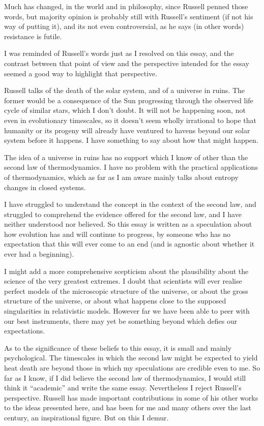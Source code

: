 \documentclass[10pt,titlepage]{article}
\begin{document}
Much has changed, in the world and in philosophy, since Russell penned those words, but majority opinion is probably still with Russell's sentiment (if not his way of putting it), and its not even controversial, as he says (in other words) resistance is futile.

I was reminded of Russell's words just as I resolved on this essay, and the contrast between that point of view and the perspective intended for the essay seemed a good way to highlight that perspective.

Russell talks of the death of the solar system, and of a universe in ruins.
The former would be a consequence of the Sun progressing through the observed life cycle of similar stars, which I don't doubt.
It will not be happening soon, not even in evolutionary timescales, so it doesn't seem wholly irrational to hope that humanity or its progeny will already have ventured to havens beyond our solar system before it happens.
I have something to say about how that might happen.

The idea of a universe in ruins has no support which I know of other than the second law of thermodynamics.
I have no problem with the practical applications of thermodynamics, which as far as I am aware mainly talks about entropy changes in closed systems.

I have struggled to understand the concept in the context of the second law, and struggled to comprehend the evidence offered for the second law, and I have neither understood nor believed.
So this essay is written as a speculation about how evolution has and will continue to progress, by someone who has no expectation that this will ever come to an end (and is agnostic about whether it ever had a beginning).

I might add a more comprehensive scepticism about the plausibility about the science of the very greatest extremes.
I doubt that scientists will ever realise perfect models of the microscopic structure of the universe, or about the gross structure of the universe, or about what happens close to the supposed singularities in relativistic models.
However far we have been able to peer with our best instruments, there may yet be something beyond which defies our expectations.

As to the significance of these beliefs to this essay, it is small and mainly psychological.
The timescales in which the second law might be expected to yield heat death are beyond those in which my speculations are credible even to me.
So far as I know, if I did believe the second law of thermodynamics, I would still think it ``academic'' and write the same essay.
Nevertheless I reject Russell's perspective.
Russell has made important contributions in some of his other works to the ideas presented here, and has been for me and many others over the last century, an inspirational figure.
But on this I demur.
\end{document}

